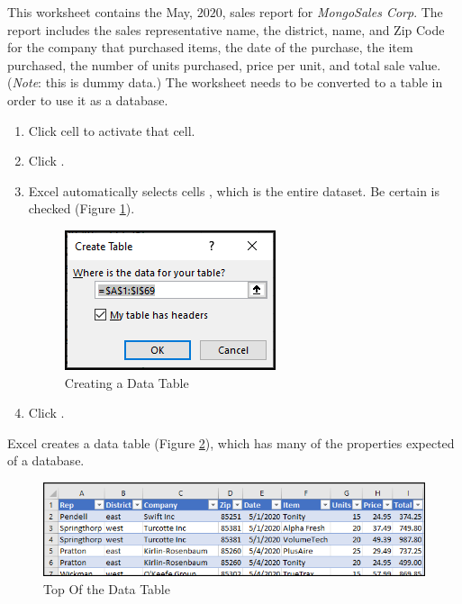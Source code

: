 This worksheet contains the May, $ 2020 $, sales report for \textit{MongoSales Corp}. The report includes the sales representative name, the district, name, and Zip Code for the company that purchased items, the date of the purchase, the item purchased, the number of units purchased, price per unit, and total sale value. (\textit{Note}: this is dummy data.) The worksheet needs to be converted to a table in order to use it as a database.

\begin{enumerate}[resume]
	\item Click cell  to activate that cell.
	\item Click .
	\item Excel automatically selects cells , which is the entire dataset. Be certain  is checked (Figure \ref{09:fig10}).

	\begin{figure}[H]
		\centering
		\includegraphics[width=\maxwidth{.50\linewidth}]{gfx/ch09_fig10}
		\caption{Creating a Data Table}
		\label{09:fig10}
	\end{figure}
	
	\item Click .
\end{enumerate}

Excel creates a data table (Figure \ref{09:fig11}), which has many of the properties expected of a database. 

\begin{figure}[H]
	\centering
	\includegraphics[width=\maxwidth{.95\linewidth}]{gfx/ch09_fig11}
	\caption{Top Of the Data Table}
	\label{09:fig11}
\end{figure}

